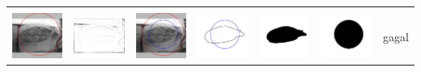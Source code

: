 \begin{table}[H]
\begin{tabular}{|m{0.7in}|m{0.7in}|m{0.7in}|m{0.7in}|m{0.7in}|m{0.7in}|m{0.7in}|}
		&  &  & & & &  \\
		\includegraphics[width=0.7in]{dataset/dataset_3/luka_merah/ready/19_integer_init.jpg}&
		\includegraphics[width=0.7in]{dataset/dataset_3/luka_merah/ready/19_integer_ext.jpg}&
		\includegraphics[width=0.7in]{dataset/dataset_3/luka_merah/ready/19_integer_result.jpg}&
		\includegraphics[width=0.7in]{dataset/dataset_3/luka_merah/ready/19_gt_r_integer.jpg}&
		\includegraphics[width=0.7in]{dataset/dataset_3/luka_merah/ready/19_r.jpg}&
		\includegraphics[width=0.7in]{dataset/dataset_3/luka_merah/ready/19_integer_r.jpg}&
		gagal\\
		\hline
		

\end{tabular}
\end{table}
